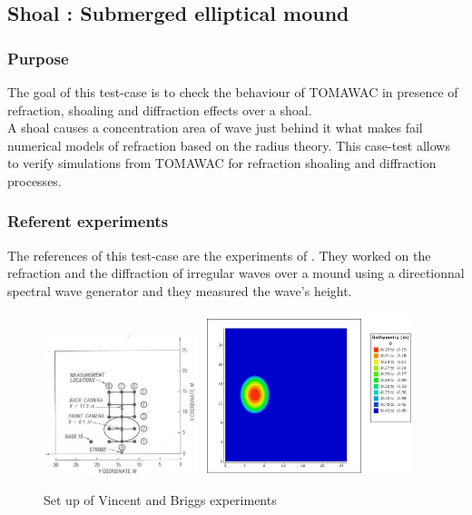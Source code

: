 \subsection{Shoal : Submerged elliptical mound}
%

%    
\subsubsection{Purpose}
The goal of this test-case is to check the behaviour of TOMAWAC in presence of refraction, shoaling and diffraction effects over a shoal.\\
A shoal causes a concentration area of wave just behind it what makes fail numerical models of refraction based on the radius theory. This case-test allows to verify simulations from TOMAWAC for refraction shoaling and diffraction processes.

\subsubsection{Referent experiments}
The references of this test-case are the experiments of \cite{vincent}. They worked on the refraction and the diffraction of irregular waves over a mound using a directionnal spectral wave generator and they measured the wave's height.\\

\begin{figure}[h!]
  \centering
    \includegraphics[width=0.4\textwidth]{setup.jpg}
      \includegraphics[width=0.55\textwidth]{bathy_shoal.jpg}
      \caption{Set up of Vincent and Briggs experiments}
\end{figure}

